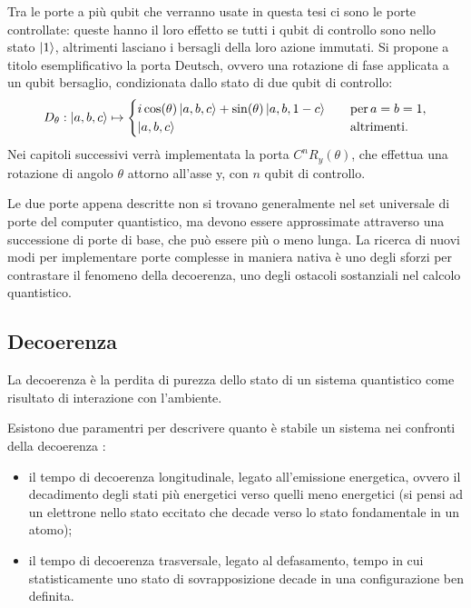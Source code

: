 Tra le porte a più qubit che verranno usate in questa tesi ci sono le porte controllate: 
queste hanno il loro effetto se tutti i qubit di controllo sono nello stato $\ket{1}$, 
altrimenti lasciano i bersagli della loro azione immutati. 
Si propone a titolo esemplificativo la porta Deutsch, ovvero una rotazione di fase applicata 
a un qubit bersaglio, condizionata dallo stato di due qubit di controllo: 
\begin{equation}
    D_{\theta} : \ket{a,b,c} \mapsto \begin{cases}
        i \cos(\theta)\ket{a,b,c} + \sin(\theta)\ket{a,b,1-c} \quad &\text{per}\, a=b=1, \\ 
        \ket{a,b,c} \quad &\text{altrimenti}.
    \end{cases}
\end{equation}
Nei capitoli successivi verrà implementata la porta $C^n R_y (\theta)$, che effettua una 
rotazione di angolo $\theta$ attorno all'asse y, con $n$ qubit di controllo. 


Le due porte appena descritte non si trovano generalmente nel set universale di porte 
del computer quantistico, ma devono 
essere approssimate attraverso una successione di porte di base, che può essere più o 
meno lunga. La ricerca di nuovi modi per implementare porte complesse in maniera 
nativa \cite{PhysRevApplied.9.051001} è uno degli sforzi per contrastare il fenomeno della 
decoerenza, uno degli ostacoli sostanziali nel calcolo quantistico. 

\subsection{Decoerenza} \label{sec:decoerenza}

\begin{definition}
    La decoerenza è la perdita di purezza dello stato di un sistema quantistico come risultato 
    di interazione con l'ambiente. 
\end{definition}

Esistono due paramentri per descrivere quanto è stabile un sistema nei confronti della decoerenza \cite{IBM_decoherence}: 
\begin{itemize}
    \item il tempo di decoerenza longitudinale, legato all'emissione energetica, 
    ovvero il decadimento degli stati più energetici verso quelli meno energetici
    (si pensi ad un elettrone nello stato eccitato che decade verso lo stato fondamentale in un atomo);
    \item il tempo di decoerenza trasversale, legato al defasamento, tempo in cui 
    statisticamente uno stato di sovrapposizione decade in una configurazione ben definita. 
\end{itemize}


